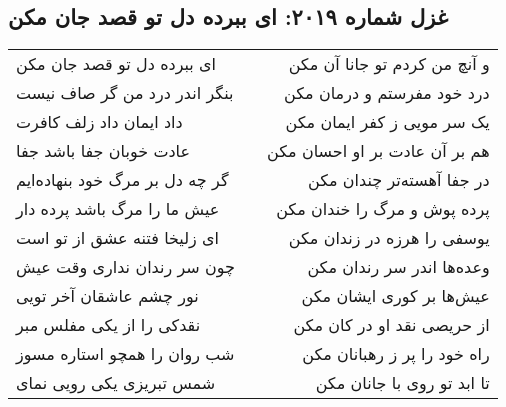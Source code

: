 \begin{center}
\section*{غزل شماره ۲۰۱۹: ای ببرده دل تو قصد جان مکن}
\label{sec:2019}
\begin{longtable}{l p{0.5cm} r}
ای ببرده دل تو قصد جان مکن
&&
و آنچ من کردم تو جانا آن مکن
\\
بنگر اندر درد من گر صاف نیست
&&
درد خود مفرستم و درمان مکن
\\
داد ایمان داد زلف کافرت
&&
یک سر مویی ز کفر ایمان مکن
\\
عادت خوبان جفا باشد جفا
&&
هم بر آن عادت بر او احسان مکن
\\
گر چه دل بر مرگ خود بنهاده‌ایم
&&
در جفا آهسته‌تر چندان مکن
\\
عیش ما را مرگ باشد پرده دار
&&
پرده پوش و مرگ را خندان مکن
\\
ای زلیخا فتنه عشق از تو است
&&
یوسفی را هرزه در زندان مکن
\\
چون سر رندان نداری وقت عیش
&&
وعده‌ها اندر سر رندان مکن
\\
نور چشم عاشقان آخر تویی
&&
عیش‌ها بر کوری ایشان مکن
\\
نقدکی را از یکی مفلس مبر
&&
از حریصی نقد او در کان مکن
\\
شب روان را همچو استاره مسوز
&&
راه خود را پر ز رهبانان مکن
\\
شمس تبریزی یکی رویی نمای
&&
تا ابد تو روی با جانان مکن
\\
\end{longtable}
\end{center}
